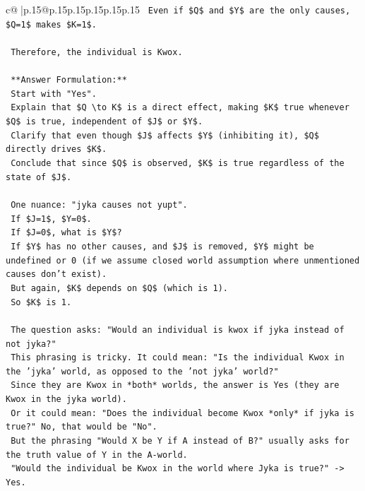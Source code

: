 \documentclass{article}
\begin{document}
{\begin{supertabular}{c@{$\;$}|p{.15\linewidth}@{}p{.15\linewidth}p{.15\linewidth}p{.15\linewidth}p{.15\linewidth}p{.15\linewidth}}
{{{\texttt{    Even if \$Q\$ and \$Y\$ are the only causes, \$Q=1\$ makes \$K=1\$.} \\
\\ 
\texttt{    Therefore, the individual is Kwox.} \\
\\ 
\texttt{    **Answer Formulation:**} \\
\texttt{    Start with "Yes".} \\
\texttt{    Explain that \$Q \textbackslash{}to K\$ is a direct effect, making \$K\$ true whenever \$Q\$ is true, independent of \$J\$ or \$Y\$.} \\
\texttt{    Clarify that even though \$J\$ affects \$Y\$ (inhibiting it), \$Q\$ directly drives \$K\$.} \\
\texttt{    Conclude that since \$Q\$ is observed, \$K\$ is true regardless of the state of \$J\$.} \\
\\ 
\texttt{    One nuance: "jyka causes not yupt".} \\
\texttt{    If \$J=1\$, \$Y=0\$.} \\
\texttt{    If \$J=0\$, what is \$Y\$?} \\
\texttt{    If \$Y\$ has no other causes, and \$J\$ is removed, \$Y\$ might be undefined or 0 (if we assume closed world assumption where unmentioned causes don't exist).} \\
\texttt{    But again, \$K\$ depends on \$Q\$ (which is 1).} \\
\texttt{    So \$K\$ is 1.} \\
\\ 
\texttt{    The question asks: "Would an individual is kwox if jyka instead of not jyka?"} \\
\texttt{    This phrasing is tricky. It could mean: "Is the individual Kwox in the 'jyka' world, as opposed to the 'not jyka' world?"} \\
\texttt{    Since they are Kwox in *both* worlds, the answer is Yes (they are Kwox in the jyka world).} \\
\texttt{    Or it could mean: "Does the individual become Kwox *only* if jyka is true?" No, that would be "No".} \\
\texttt{    But the phrasing "Would X be Y if A instead of B?" usually asks for the truth value of Y in the A{-}world.} \\
\texttt{    "Would the individual be Kwox in the world where Jyka is true?" {-}> Yes.} \\
\\ 
}}}
\end{supertabular}}
\end{document}
